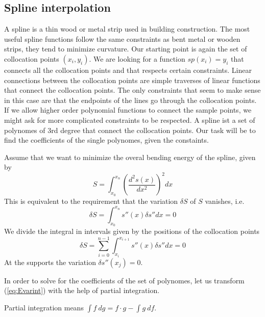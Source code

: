 \subsection{Spline interpolation}
A spline is a thin wood or metal strip used in building construction. The most
useful spline functions follow the same constraints as bent metal or wooden
strips, they tend to minimize curvature. Our starting point is again the set of
collocation points $(x_i,y_i)$. We are looking for a function $sp(x_i)=y_i$
that connects all the collocation points and that respects certain constraints.
Linear connections between the collocation points are simple traverses of
linear functions that connect the collocation points. The only constraints that
seem to make sense in this case are that the endpoints of the lines go through
the collocation points. If we allow higher order polynomial functions to connect
the sample points, we might ask for more complicated constraints to be
respected. A spline ist a set of polynomes of 3rd degree that connect the
collocation points. Our task will be to find the coefficients of the single
polynomes, given the constaints.

Assume that we want to minimize the overal bending energy of the spline, given by
\begin{equation}
	S=\int_{x_0}^{x_n}\left(\frac{d^2 s(x)}{dx^2}\right)^2dx
	\label{eq:bendingE}
\end{equation}
This is equivalent to the requirement that the variation $\delta S$ of $S$ vanishes, i.e.
\begin{equation}
	\delta S=\int_{x_0}^{x_n} s''(x) \delta s''dx=0
	\label{eq:Evar}
\end{equation}
We divide the integral in intervals given by the positions of the collocation points
\begin{equation}
	\delta S=\sum_{i=0}^{n-1}\int_{x_i}^{x_{i+1}} s''(x) \delta s''dx=0
	\label{eq:Evarint}
\end{equation}
At the supports the variation $\delta s''(x_j)=0$.

In order to solve for the coefficients of the set of polynomes, let us
transform (\ref{eq:Evarint}) with the help of partial integration.

\begin{note}{} 
	Partial integration means $\int f\ dg = f\cdot g - \int g\ df$.
\end{note}

